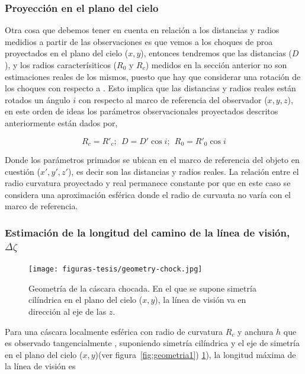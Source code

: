 \subsubsection{Proyección en el plano del cielo}
\label{sec:pro}

Otra cosa que debemos  tener en cuenta en relación a los distancias y radios medidios a partir de las observaciones es que vemos a los choques de proa proyectados en el plano del cielo (\(x, y\)), entonces tendremos que las distancias (\(D\)), y los  radios caracterísiticos (\(R_{0}\) y \(R_{c}\)) medidos en la sección anterior no son estimaciones reales de los mismos, puesto que hay que considerar una rotación de los choques con respecto a \thC{}. Esto implica que las distancias y radios reales están rotados un ángulo \(i\) con respecto al marco de referencia del observador (\(x, y, z\)), en este orden de ideas los parámetros observacionales proyectados descritos anteriormente están dados por,

\begin{equation*}
  R_{c} = R'_{c};~~
  D = D' \cos i;~~ 
  R_{0} = R'_{0} \cos i
\end{equation*}

Donde los parámetros primados se ubican en el marco de referencia del objeto en cuestión (\(x', y', z'\)), es decir son las distancias y radios reales. La relación entre el radio curvatura proyectado y real permanece constante por que en este caso se considera una aproximación esférica donde el radio de curvauta no varía con el marco de referencia. 

\subsubsection{Estimación de la longitud del camino de la línea de visión, \(\Delta \zeta\)}
\label{sec:camino}

\begin{figure}
  \centering
  \texttt{[image: figuras-tesis/geometry-chock.jpg]}
  \caption{Geometría de la cáscara chocada. En el que se supone simetría cilíndrica en el plano del cielo (\(x, y\)), la línea de visión va en dirección al eje de las \(z\).}
  \label{fig:geometria}
\end{figure}

Para una cáscara localmente esférica con radio de curvatura \(R_{c}\) y anchura \(h\) que es observado tangencialmente \citeauthor{Henney:2013a}, suponiendo simetría cilíndrica y el eje de simetría en el plano del cielo (\(x, y\))(ver figura~\ref{fig:geometria1})  \ref{fig:geometria}), la longitud máxima de la línea de visión es


